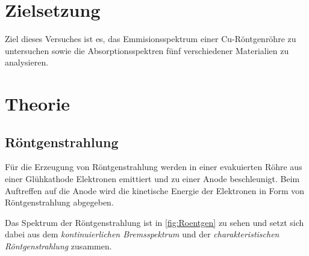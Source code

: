 \section{Zielsetzung}

Ziel dieses Versuches ist es, das Emmisionsspektrum einer Cu-Röntgenröhre zu untersuchen
sowie die Absorptionsspektren fünf verschiedener Materialien zu analysieren.

\section{Theorie}
\label{sec:Theorie}

\subsection{Röntgenstrahlung}
\label{sec:Röntgenstrahlung}

Für die Erzeugung von Röntgenstrahlung werden in einer evakuierten Röhre aus einer Glühkathode Elektronen emittiert
und zu einer Anode beschleunigt. Beim Auftreffen auf die Anode wird die kinetische Energie der Elektronen in Form von
Röntgenstrahlung abgegeben.

Das Spektrum der Röntgenstrahlung ist in \autoref{fig:Roentgen} zu sehen und setzt sich dabei aus dem
\textit{kontinuierlichen Bremsspektrum} und der \textit{charakteristischen Röntgenstrahlung} zusammen.

